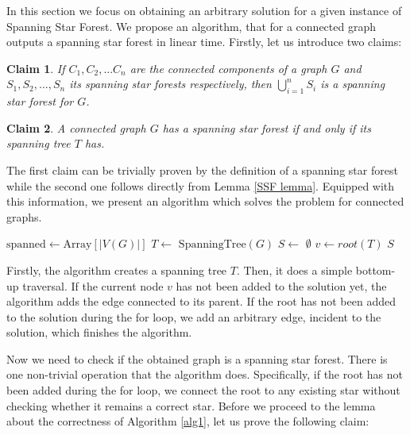 \documentclass[en]{pracamgr}
\newtheorem{claim}{Claim}
\theoremstyle{definition}
\newcommand{\ssf}{spanning star forest}
\newcommand{\ssfp}{{\sc Spanning Star Forest}}
\begin{document}
In this section we focus on obtaining an arbitrary solution for a given instance of \ssfp{}. We propose an algorithm, that for a connected graph outputs a spanning star forest in linear time. Firstly, let us introduce two claims:

\begin{claim} \label{SSF sum}
	If $C_1,C_2,...C_n$ are the connected components of a graph $G$ and $S_1,S_2,...,S_n$ its \ssf{}s respectively, then $\bigcup\limits_{i=1}^n S_i$ is a \ssf{} for $G$.
\end{claim}

\begin{claim} \label{Spanning tree SSF}
	A connected graph $G$ has a \ssf{} if and only if its spanning tree $T$ has.
\end{claim}

The first claim can be trivially proven by the definition of a \ssf{} while the second one follows directly from Lemma \ref{SSF lemma}. Equipped with this information, we present an algorithm which solves the problem for connected graphs.

\begin{algorithm}\label{alg1}
	\KwOut{\ssf{} of $G$}
	$\textrm{spanned} \leftarrow \textrm{Array}[|V(G)|]$\;
	$T \leftarrow$ $\textrm{SpanningTree}(G)$\;
	$S \leftarrow$ $\emptyset$\;
	$v \leftarrow root(T)$\;
	\Return $S$\;
	\caption{Obtaining a spanning star forest from a connected graph.}
\end{algorithm}

Firstly, the algorithm creates a spanning tree $T$. Then, it does a simple bottom-up traversal. If the current node $v$ has not been added to the solution yet, the algorithm adds the edge connected to its parent. If the root has not been added to the solution during the for loop, we add an arbitrary edge, incident to the solution, which finishes the algorithm.

Now we need to check if the obtained graph is a spanning star forest. There is one non-trivial operation that the algorithm does. Specifically, if the root has not  been added during the for loop, we connect the root to any existing star without checking whether it remains a correct star. Before we proceed to the lemma about the correctness of Algorithm \ref{alg1}, let us prove the following claim:
\end{document}
